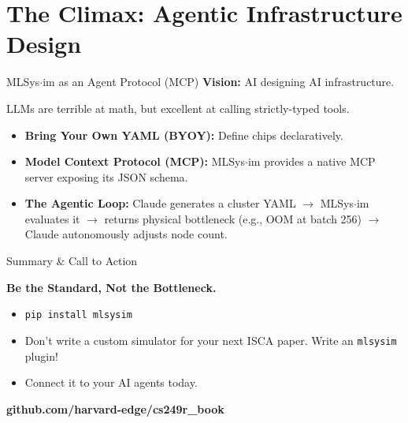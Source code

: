 \documentclass[aspectratio=169, 10pt]{beamer}
\begin{document}
\section{The Climax: Agentic Infrastructure Design}

\begin{frame}{MLSys$\cdot$im as an Agent Protocol (MCP)}
    \textbf{Vision:} AI designing AI infrastructure.
    \vspace{0.3cm}
    
    LLMs are terrible at math, but excellent at calling strictly-typed tools.
    \begin{itemize}
        \item \textbf{Bring Your Own YAML (BYOY):} Define chips declaratively.
        \item \textbf{Model Context Protocol (MCP):} MLSys$\cdot$im provides a native MCP server exposing its JSON schema.
        \item \textbf{The Agentic Loop:} Claude generates a cluster YAML $\rightarrow$ MLSys$\cdot$im evaluates it $\rightarrow$ returns physical bottleneck (e.g., OOM at batch 256) $\rightarrow$ Claude autonomously adjusts node count.
    \end{itemize}
\end{frame}

\begin{frame}{Summary \& Call to Action}
    \begin{center}
        \Large \textbf{Be the Standard, Not the Bottleneck.}
    \end{center}
    
    \vspace{0.5cm}
    \begin{itemize}
        \item \texttt{pip install mlsysim}
        \item Don't write a custom simulator for your next ISCA paper. Write an \texttt{mlsysim} plugin!
        \item Connect it to your AI agents today.
    \end{itemize}
    \vspace{0.5cm}
    \centering
    \textbf{github.com/harvard-edge/cs249r\_book}
\end{frame}
\end{document}
